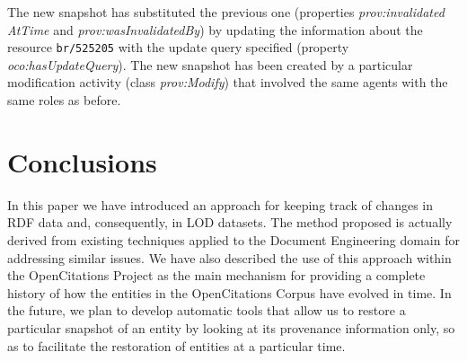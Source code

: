\documentclass[runningheads,a4paper]{llncs}
\begin{document}
The new snapshot has substituted the previous one (properties {\em prov:invalidated} {\em AtTime} and {\em prov:wasInvalidatedBy}) by updating the information about the resource \Verb+br/525205+ with the update query specified (property {\em oco:hasUpdateQuery}). The new snapshot has been created by a particular modification activity (class {\em prov:Modify}) that involved the same agents with the same roles as before.

\section{Conclusions}\label{__RefHeading__16816_1591320820}

In this paper we have introduced an approach for keeping track of changes in RDF data and, consequently, in LOD datasets. The method proposed is actually derived from existing techniques applied to the Document Engineering domain for addressing similar issues. We have also described the use of this approach within the OpenCitations Project as the main mechanism for providing a complete history of how the entities in the OpenCitations Corpus have evolved in time. In the future, we plan to develop automatic tools that allow us to restore a particular snapshot of an entity by looking at its provenance information only, so as to facilitate the restoration of entities at a particular time.
\end{document}
